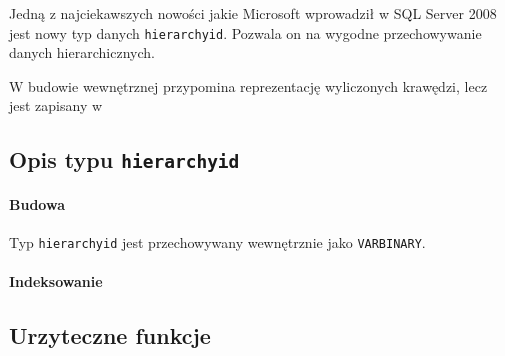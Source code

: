 Jedną z najciekawszych nowości jakie Microsoft wprowadził w SQL Server 2008 jest nowy typ danych \texttt{hierarchyid}. 
Pozwala on na wygodne przechowywanie danych hierarchicznych.

W budowie wewnętrznej przypomina reprezentację wyliczonych krawędzi, lecz jest zapisany w


\subsection*{Opis typu \texttt{hierarchyid}}

\paragraph{Budowa}

Typ \texttt{hierarchyid} jest przechowywany wewnętrznie jako \texttt{VARBINARY}. 


\paragraph{Indeksowanie}



\subsection{Urzyteczne funkcje}

